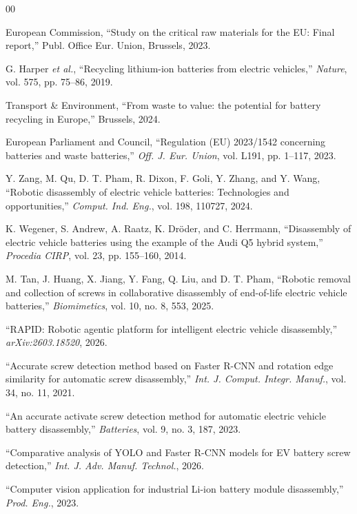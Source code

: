 \documentclass[conference]{IEEEtran}
\begin{document}
\begin{thebibliography}{00}

 European Commission, ``Study on the critical raw materials for the
EU: Final report,'' Publ. Office Eur. Union, Brussels, 2023.

 G. Harper \emph{et al.}, ``Recycling lithium-ion batteries from
electric vehicles,'' \emph{Nature}, vol. 575, pp. 75--86, 2019.

 Transport \& Environment, ``From waste to value: the potential for
battery recycling in Europe,'' Brussels, 2024.

 European Parliament and Council, ``Regulation (EU) 2023/1542
concerning batteries and waste batteries,'' \emph{Off. J. Eur. Union}, vol. L191, pp. 1--117, 2023.

 Y. Zang, M. Qu, D. T. Pham, R. Dixon, F. Goli, Y. Zhang,
and Y. Wang, ``Robotic disassembly of electric vehicle batteries: Technologies and
opportunities,'' \emph{Comput. Ind. Eng.}, vol. 198, 110727, 2024.

 K. Wegener, S. Andrew, A. Raatz, K. Dr\"oder, and C. Herrmann,
``Disassembly of electric vehicle batteries using the example of the Audi Q5 hybrid
system,'' \emph{Procedia CIRP}, vol. 23, pp. 155--160, 2014.

 M. Tan, J. Huang, X. Jiang, Y. Fang, Q. Liu, and D. T. Pham,
``Robotic removal and collection of screws in collaborative disassembly of
end-of-life electric vehicle batteries,'' \emph{Biomimetics}, vol. 10, no. 8, 553,
2025.

 ``RAPID: Robotic agentic platform for intelligent electric
vehicle disassembly,'' \emph{arXiv:2603.18520}, 2026.

 ``Accurate screw detection method based on Faster R-CNN and
rotation edge similarity for automatic screw disassembly,'' \emph{Int. J. Comput. Integr. Manuf.}, vol. 34, no. 11, 2021.

 ``An accurate activate screw detection method for automatic
electric vehicle battery disassembly,'' \emph{Batteries}, vol. 9, no. 3, 187, 2023.

 ``Comparative analysis of YOLO and Faster R-CNN models for
EV battery screw detection,'' \emph{Int. J. Adv. Manuf. Technol.}, 2026.

 ``Computer vision application for industrial Li-ion battery
module disassembly,'' \emph{Prod. Eng.}, 2023.


\end{thebibliography}
\end{document}
